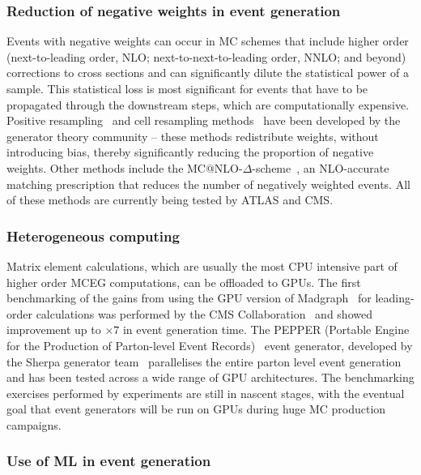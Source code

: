 \documentclass[10pt,a4paper]{article}
\begin{document}
\subsubsection{Reduction of negative weights in event
generation}\label{reduction-of-negative-weights-in-event-generation}

Events with negative weights can occur in MC schemes that include
higher order (next-to-leading order, NLO; next-to-next-to-leading order, NNLO; and beyond)
corrections to cross sections and can
significantly dilute the statistical power of a sample. This statistical loss is
most significant for events that have to be propagated through the downstream steps,
which are computationally expensive. Positive resampling~\cite{Andersen:2020sjs}
and cell resampling methods~\cite{Andersen:2021mvw} have been developed by the
generator theory community -- these methods redistribute weights, without
introducing bias, thereby significantly reducing the proportion of negative
weights. Other methods include the
MC@NLO-$\Delta$-scheme~\cite{Frederix:2020trv}, an NLO-accurate matching
prescription that reduces the number of negatively weighted events. All of these
methods are currently being tested by ATLAS and CMS.

\subsubsection{Heterogeneous computing}\label{heterogeneous-computing}

Matrix element calculations, which are usually the most CPU intensive part of
higher order MCEG computations, can be offloaded to GPUs. The first benchmarking
of the gains from using the GPU version of
Madgraph~\cite{Alwall:2014hca, Hageboeck:2023blb, Valassi:2022dkc, Wettersten:2023ekm}
for leading-order calculations was
performed by the CMS Collaboration~\cite{CMS-DP-2024-086} and showed
improvement up to $\times 7$ in event generation time. The PEPPER (Portable
Engine for the Production of Parton-level Event Records)~\cite{Bothmann:2023gew}
event generator, developed by the Sherpa generator team~\cite{Sherpa:2019gpd}
parallelises the entire parton level event generation and has been tested across
a wide range of GPU architectures. The benchmarking exercises performed by
experiments are still in nascent stages, with the eventual goal that event
generators will be run on GPUs during huge MC production campaigns.

\subsubsection{Use of ML in event generation}
\label{use-of-ml-in-event-generation}
\end{document}
